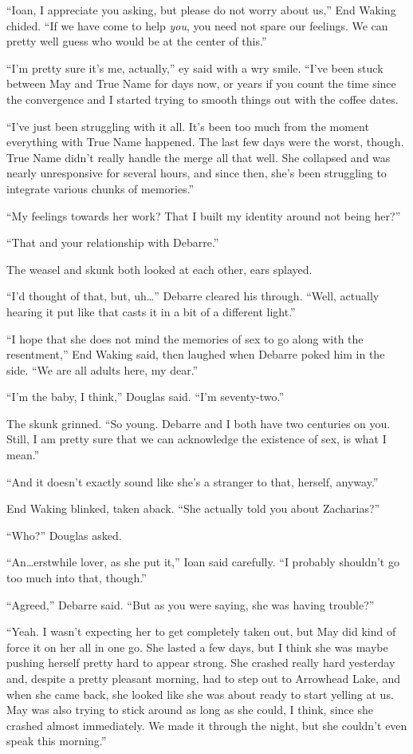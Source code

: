 ``Ioan, I appreciate you asking, but please do not worry about us,'' End Waking chided. ``If we have come to help \emph{you}, you need not spare our feelings. We can pretty well guess who would be at the center of this.''

``I'm pretty sure it's me, actually,'' ey said with a wry smile. ``I've been stuck between May and True Name for days now, or years if you count the time since the convergence and I started trying to smooth things out with the coffee dates.

``I've just been struggling with it all. It's been too much from the moment everything with True Name happened. The last few days were the worst, though. True Name didn't really handle the merge all that well. She collapsed and was nearly unresponsive for several hours, and since then, she's been struggling to integrate various chunks of memories.''

``My feelings towards her work? That I built my identity around not being her?''

``That and your relationship with Debarre.''

The weasel and skunk both looked at each other, ears splayed.

``I'd thought of that, but, uh\ldots{}'' Debarre cleared his through. ``Well, actually hearing it put like that casts it in a bit of a different light.''

``I hope that she does not mind the memories of sex to go along with the resentment,'' End Waking said, then laughed when Debarre poked him in the side. ``We are all adults here, my dear.''

``I'm the baby, I think,'' Douglas said. ``I'm seventy-two.''

The skunk grinned. ``So young. Debarre and I both have two centuries on you. Still, I am pretty sure that we can acknowledge the existence of sex, is what I mean.''

``And it doesn't exactly sound like she's a stranger to that, herself, anyway.''

End Waking blinked, taken aback. ``She actually told you about Zacharias?''

``Who?'' Douglas asked.

``An\ldots erstwhile lover, as she put it,'' Ioan said carefully. ``I probably shouldn't go too much into that, though.''

``Agreed,'' Debarre said. ``But as you were saying, she was having trouble?''

``Yeah. I wasn't expecting her to get completely taken out, but May did kind of force it on her all in one go. She lasted a few days, but I think she was maybe pushing herself pretty hard to appear strong. She crashed really hard yesterday and, despite a pretty pleasant morning, had to step out to Arrowhead Lake, and when she came back, she looked like she was about ready to start yelling at us. May was also trying to stick around as long as she could, I think, since she crashed almost immediately. We made it through the night, but she couldn't even speak this morning.''

